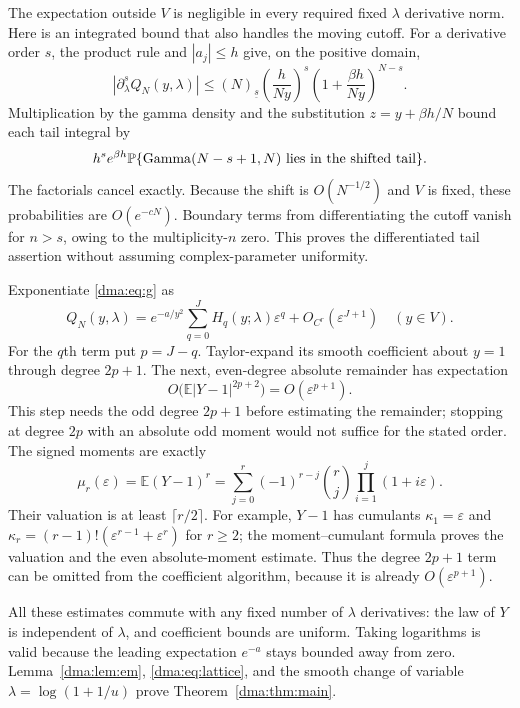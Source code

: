 \documentclass[11pt,letterpaper]{article}
\theoremstyle{remark}\newtheorem{remark}[theorem]{Remark}
\newcommand{\E}{\mathbb E}
\newcommand{\Prob}{\mathbb P}
\newcommand{\fall}[2]{(#1)_{\underline{#2}}}
\begin{document}
The expectation outside $V$ is negligible in every required fixed $\lambda$ derivative norm. Here is an integrated bound that also handles the moving cutoff. For a derivative order $s$, the product rule and $|a_j|\leq h$ give, on the positive domain,
\[
 |\partial_\lambda^s Q_N(y,\lambda)|
 \leq\fall Ns\left(\frac h{Ny}\right)^s
 \left(1+\frac{\beta h}{Ny}\right)^{N-s}.
\]
Multiplication by the gamma density and the substitution $z=y+\beta h/N$ bound each tail integral by
\begin{equation}\label{dma:eq:scaledtail}
 h^s e^{\beta h}\Prob\{\operatorname{Gamma}(N-s+1,N)
 \hbox{ lies in the shifted tail}\}.
\end{equation}
The factorials cancel exactly. Because the shift is $O(N^{-1/2})$ and $V$ is fixed, these probabilities are $O(e^{-cN})$. Boundary terms from differentiating the cutoff vanish for $n>s$, owing to the multiplicity-$n$ zero. This proves the differentiated tail assertion without assuming complex-parameter uniformity.

Exponentiate \eqref{dma:eq:g} as
\[
 Q_N(y,\lambda)=e^{-a/y^2}\sum_{q=0}^JH_q(y;\lambda)\varepsilon^q
 +O_{C^r}(\varepsilon^{J+1})\quad(y\in V).
\]
For the $q$th term put $p=J-q$. Taylor-expand its smooth coefficient about $y=1$ through degree $2p+1$. The next, even-degree absolute remainder has expectation
\[
 O\bigl(\E|Y-1|^{2p+2}\bigr)=O(\varepsilon^{p+1}).
\]
This step needs the odd degree $2p+1$ before estimating the remainder; stopping at degree $2p$ with an absolute odd moment would not suffice for the stated order. The signed moments are exactly
\begin{equation}\label{dma:eq:mu}
 \mu_r(\varepsilon)=\E(Y-1)^r
 =\sum_{j=0}^r(-1)^{r-j}\binom rj\prod_{i=1}^j(1+i\varepsilon).
\end{equation}
Their valuation is at least $\lceil r/2\rceil$. For example, $Y-1$ has cumulants $\kappa_1=\varepsilon$ and
$\kappa_r=(r-1)!(\varepsilon^{r-1}+\varepsilon^r)$ for $r\geq2$; the moment--cumulant formula proves the valuation and the even absolute-moment estimate. Thus the degree $2p+1$ term can be omitted from the coefficient algorithm, because it is already $O(\varepsilon^{p+1})$.

All these estimates commute with any fixed number of $\lambda$ derivatives: the law of $Y$ is independent of $\lambda$, and coefficient bounds are uniform. Taking logarithms is valid because the leading expectation $e^{-a}$ stays bounded away from zero. Lemma~\ref{dma:lem:em}, \eqref{dma:eq:lattice}, and the smooth change of variable $\lambda=\log(1+1/u)$ prove Theorem~\ref{dma:thm:main}.
\end{document}

